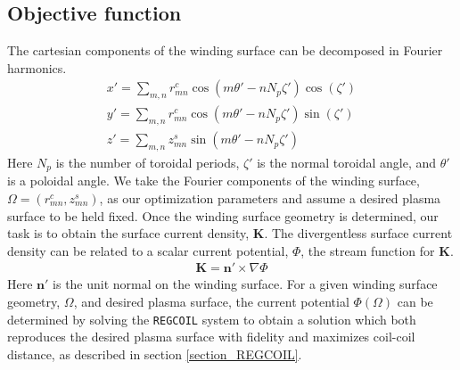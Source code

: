 \documentclass[aps,unsortedaddress]{revtex4-1}
\begin{document}
\subsection{Objective function}
The cartesian components of the winding surface can be decomposed in Fourier harmonics.
\begin{gather}
x' = \sum_{m,n} r_{mn}^c \cos(m \theta' - n N_p \zeta') \cos (\zeta') \\
y' = \sum_{m,n} r_{mn}^c \cos(m \theta' - n N_p \zeta') \sin (\zeta') \\
z' = \sum_{m,n} z_{mn}^s \sin(m \theta' - n N_p \zeta') 
\label{Fourier}
\end{gather}
Here $N_p$ is the number of toroidal periods, $\zeta'$ is the normal toroidal angle, and $\theta'$ is a poloidal angle. We take the Fourier components of the winding surface, $\Omega = (r_{mn}^c, z_{mn}^s)$, as our optimization parameters and assume a desired plasma surface to be held fixed. Once the winding surface geometry is determined, our task is to obtain the surface current density, $\bm{K}$. The divergentless surface current density can be related to a scalar current potential, $\Phi$, the stream function for $\bm{K}$.
\begin{gather}
\bm{K} = \bm{n}' \times \nabla \Phi
\end{gather}
Here $\bm{n}'$ is the unit normal on the winding surface. For a given winding surface geometry, $\Omega$, and desired plasma surface, the current potential $\Phi (\Omega)$ can be determined by solving the \texttt{REGCOIL} system to obtain a solution which both reproduces the desired plasma surface with fidelity and maximizes coil-coil distance, as described in section \ref{section_REGCOIL}.
\end{document}
